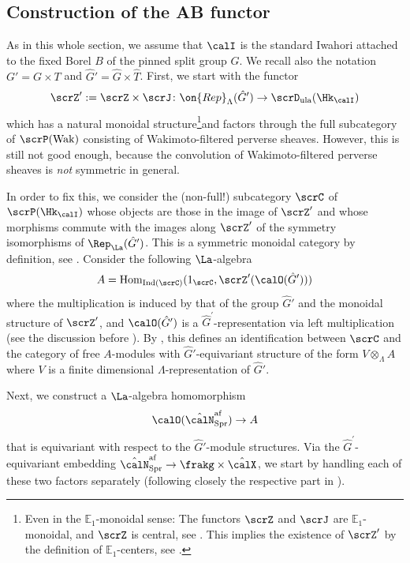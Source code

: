 \documentclass[10pt, reqno]{amsart}
\theoremstyle{plain}
\theoremstyle{definition}
\numberwithin{equation}{section}
\begin{document}
\subsection{Construction of the AB functor}
As in this whole section, we assume that $\calI$ is the standard Iwahori attached to the fixed Borel $B$ of the pinned split group $G$. We recall also the notation $G'=G\times T$ and $\hat{G}'=\hat{G}\times \hat{T}$. First, we start with the functor
\begin{equation}
	\scrZ':=\scrZ \times \scrJ \colon \on{Rep}_\Lambda (\hat{G}') \to \scrD_{\mathrm{ula}}(\Hk_{\calI})
\end{equation}
which has a natural monoidal structure\footnote{Even in the $\mathbb{E}_1$-monoidal sense: The functors $\scrZ$ and $\scrJ$ are $\mathbb{E}_1$-monoidal, and $\scrZ$ is central, see . This implies the existence of $\scrZ'$ by the definition of $\mathbb{E}_1$-centers, see \cite[Definition 5.3.1.2]{Lur17}.}and factors through the full subcategory of $ \scrP(\mathrm{Wak})$ consisting of Wakimoto-filtered perverse sheaves. However, this is still not good enough, because the convolution of Wakimoto-filtered perverse sheaves is \textit{not} {symmetric} in general.

In order to fix this, we consider the (non-full!) subcategory $\scrC$ of $ \scrP(\Hk_{\calI})$ whose objects are those in the image of $\scrZ'$ and whose morphisms commute with the images along $\scrZ'$ of the symmetry isomorphisms of $\Rep_\La(\hat{G}')$. This is a symmetric monoidal category
by definition, see \cite[Lemma 6.3.3]{AR}. Consider the following $\La$-algebra
\begin{equation}
	A=\mathrm{Hom}_{\mathrm{Ind}(\scrC)}(1_\scrC,\scrZ'(\calO(\hat{G}')))
\end{equation}
where the multiplication is induced by that of the group $\hat{G}'$ and the monoidal structure of $\scrZ'$, and $\calO(\hat{G}^\prime)$ is a $\hat{G}^\prime$-representation via left multiplication (see the discussion before \cite[Proposition 6.3.5]{AR}). By \cite[Proposition 6.3.5]{AR}, this defines an identification between $\scrC$ and the category of free $A$-modules with $\hat{G}'$-equivariant structure of the form $V\otimes_\Lambda A$ where $V$ is a finite dimensional $\Lambda$-representation of $\hat{G}'$.

Next, we construct a $\La$-algebra homomorphism
\begin{equation}
	\calO(\hat{\calN}_{\mathrm{Spr}}^{\mathrm{af}}) \to A
\end{equation}
that is equivariant with respect to the $\hat{G}'$-module structures. Via the $\hat{G}^\prime$-equivariant embedding  $\hat{\calN}_{\mathrm{Spr}}^{\mathrm{af}}\to \frakg \times \hat{\calX}$, we start by handling each of these two factors separately (following closely the respective part in \cite[Section 6.3]{AR}).
\end{document}
